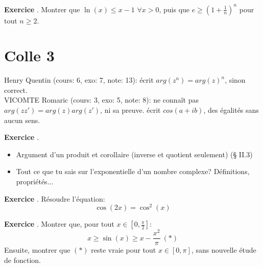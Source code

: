 \documentclass[10pt,a4paper]{article}
\newcounter{question}
\newcounter{exo}
\newenvironment{exo}{\vspace{0.5cm}\setcounter{question}{0}\addtocounter{exo}{1} \noindent \textbf{Exercice \theexo}. \normalsize }{\par}
\begin{document}
	\begin{exo}
		Montrer que $\ln(x) \leq x - 1$ $\forall x > 0$, puis que $e \geq (1 + \frac{1}{n})^n$ pour tout $n \geq 2$.
	\end{exo}

	\section*{Colle 3}
	\setcounter{exo}{0}
	Henry Quentin (cours: 6, exo: 7, note: 13): écrit $arg(z^n) = arg(z)^n$, sinon correct.\\
	VICOMTE Romaric (cours: 3, exo: 5, note: 8): ne connaît pas $arg(z z') = arg(z)arg(z')$, ni sa preuve. écrit $cos(a+ib)$, des égalités sans aucun sens.
	
	\begin{exo}
		\begin{itemize}
			\item Argument d'un produit et corollaire (inverse et quotient seulement) (§ II.3)
			\item Tout ce que tu sais sur l'exponentielle d'un nombre complexe? Définitions, propriétés...
		\end{itemize}
	\end{exo}
	
	\begin{exo}
		Résoudre l'équation:
		$$\cos(2x) = \cos^2(x)$$
	\end{exo}
	
	\begin{exo}
		Montrer que, pour tout $x \in [0, \frac{\pi}{2}]$:
		$$x \geq \sin(x) \geq x - \frac{x^2}{\pi} ~ (*)$$
		Ensuite, montrer que $(*)$ reste vraie pour tout $x \in [0, {\pi}]$, sans nouvelle étude de fonction.
	\end{exo}
\end{document}
